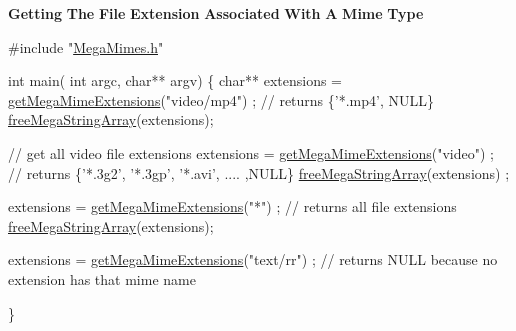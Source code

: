 {\bfseries Getting} {\bfseries The} {\bfseries File} {\bfseries Extension} {\bfseries Associated} {\bfseries With} {\bfseries A} {\bfseries Mime} {\bfseries Type} 
\begin{DoxyCode}
\textcolor{preprocessor}{#include "\hyperlink{MegaMimes_8h}{MegaMimes.h}"}
 
 \textcolor{keywordtype}{int} main( \textcolor{keywordtype}{int} argc, \textcolor{keywordtype}{char}** argv)
 \{
    \textcolor{keywordtype}{char}** extensions = \hyperlink{MegaMimes_8h_a29775655c03675b861aa29571b394283}{getMegaMimeExtensions}(\textcolor{stringliteral}{"video/mp4"}) ;
    \textcolor{comment}{// returns \{'*.mp4', NULL\}}
    \hyperlink{MegaMimes_8h_ac51929b1a876c679b38af9f0854ecd41}{freeMegaStringArray}(extensions);

    \textcolor{comment}{// get all video file extensions}
   extensions = \hyperlink{MegaMimes_8h_a29775655c03675b861aa29571b394283}{getMegaMimeExtensions}(\textcolor{stringliteral}{"video"}) ; 
   \textcolor{comment}{// returns \{'*.3g2', '*.3gp', '*.avi', .... ,NULL\}}
   \hyperlink{MegaMimes_8h_ac51929b1a876c679b38af9f0854ecd41}{freeMegaStringArray}(extensions) ;

   extensions = \hyperlink{MegaMimes_8h_a29775655c03675b861aa29571b394283}{getMegaMimeExtensions}(\textcolor{stringliteral}{"*"}) ;
   \textcolor{comment}{// returns all file extensions}
   \hyperlink{MegaMimes_8h_ac51929b1a876c679b38af9f0854ecd41}{freeMegaStringArray}(extensions);

   extensions = \hyperlink{MegaMimes_8h_a29775655c03675b861aa29571b394283}{getMegaMimeExtensions}(\textcolor{stringliteral}{"text/rr"}) ;
   \textcolor{comment}{// returns NULL because no extension has that mime name }

 \}
\end{DoxyCode}


